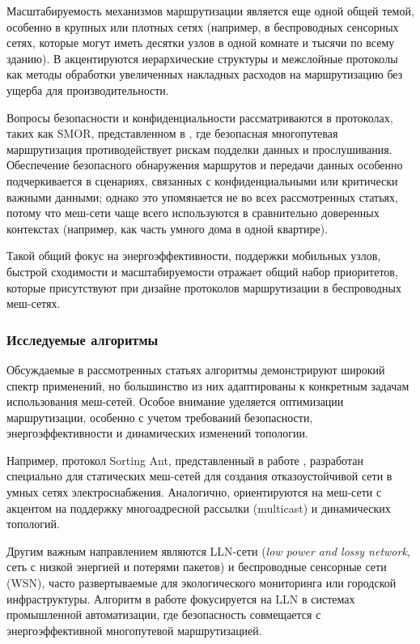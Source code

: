 \documentclass[%
]{report}
\begin{document}
Масштабируемость механизмов маршрутизации
является еще одной общей темой,
особенно в крупных или плотных сетях
(например, в беспроводных сенсорных сетях,
которые могут иметь десятки узлов в одной комнате
и тысячи по всему зданию).
В \textcite{ALVAREZ2008240}
акцентируются иерархические структуры
и межслойные протоколы как методы обработки
увеличенных накладных расходов на маршрутизацию
без ущерба для производительности.

Вопросы безопасности и конфиденциальности
рассматриваются в протоколах, таких как SMOR,
представленном в \textcite{KRENTZ202457},
где безопасная многопутевая маршрутизация
противодействует рискам подделки данных и прослушивания.
Обеспечение безопасного обнаружения маршрутов
и передачи данных особенно подчеркивается в сценариях,
связанных с конфиденциальными или критически важными данными;
однако это упомянается не во всех рассмотренных статьях,
потому что меш-сети чаще всего используются
в сравнительно доверенных контекстах (например,
как часть умного дома в одной квартире).

Такой общий фокус на энергоэффективности,
поддержки мобильных узлов, быстрой сходимости
и масштабируемости отражает
общий набор приоритетов,
которые присутствуют при дизайне протоколов
маршрутизации в беспроводных меш-сетях.


\subsubsection{Исследуемые алгоритмы}\label{used-algorithms}

Обсуждаемые в рассмотренных статьях алгоритмы демонстрируют
широкий спектр применений, но большинство из них адаптированы
к конкретным задачам использования меш-сетей.
Особое внимание уделяется оптимизации
маршрутизации, особенно с учетом требований безопасности,
энергоэффективности и динамических изменений топологии.

Например, протокол Sorting Ant,
представленный в работе \textcite{LI2020570},
разработан специально для статических меш-сетей
для создания отказоустойчивой сети в
умных сетях электроснабжения.
Аналогично, \textcite{PAN2012952}
ориентируются на меш-сети с акцентом на
поддержку многоадресной рассылки (multicast)
и динамических топологий.

Другим важным направлением являются LLN-сети
(\emph{low power and lossy network},
сеть с низкой энергией и потерями пакетов)
и беспроводные сенсорные сети (WSN),
часто развертываемые для экологического мониторинга
или городской инфраструктуры.
Алгоритм в работе \textcite{KRENTZ202457}
фокусируется на LLN в системах промышленной автоматизации,
где безопасность совмещается с  энергоэффективной
многопутевой маршрутизацией.
\end{document}
